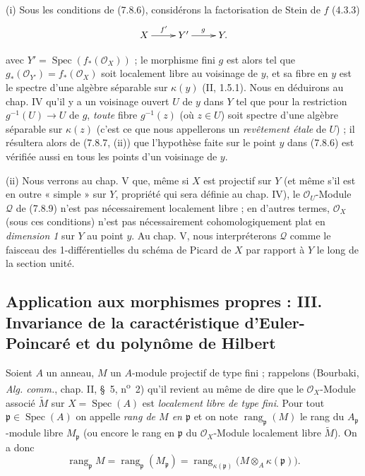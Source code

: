 \begin{remarks}[7.8.10]
\textnormal{(i)} Sous les conditions de (7.8.6), considérons la factorisation de
Stein de $f$ (4.3.3)
\[
\xymatrix{
  X \ar[r]^{f'} & Y' \ar[r]^{g} & Y .
}
\]

avec $Y'=\operatorname{Spec}(f_*(\mathscr O_X))$ ; le morphisme fini $g$ est alors
tel que $g_*(\mathscr O_{Y'})=f_*(\mathscr O_X)$ soit localement libre au
voisinage de $y$, et sa fibre en $y$ est le spectre d'une algèbre séparable sur
$\kappa(y)$ (II, 1.5.1). Nous en déduirons au chap. IV qu'il y a un voisinage
ouvert $U$ de $y$ dans $Y$ tel que pour la restriction $g^{-1}(U)\to U$ de $g$,
\emph{toute} fibre $g^{-1}(z)$ (où $z\in U$) soit spectre d'une algèbre séparable
sur $\kappa(z)$ (c'est ce que nous appellerons un \emph{revêtement étale} de
$U$) ; il résultera alors de (7.8.7, (ii)) que l'hypothèse faite sur le point
$y$ dans (7.8.6) est vérifiée aussi en tous les points d'un voisinage de $y$.

\medskip
\textnormal{(ii)} Nous verrons au chap. V que, même si $X$ est projectif sur $Y$
(et même s'il est en outre « simple » sur $Y$, propriété qui sera définie au
chap. IV), le $\mathscr O_U$-Module $\mathscr Q$ de (7.8.9) n'est pas
nécessairement localement libre ; en d'autres termes, $\mathscr O_X$ (sous ces
conditions) n'est pas nécessairement cohomologiquement plat en \emph{dimension
1} sur $Y$ au point $y$. Au chap. V, nous interpréterons $\mathscr Q$ comme le
faisceau des 1-différentielles du schéma de Picard de $X$ par rapport à $Y$ le
long de la section unité.
\end{remarks}

\subsection{Application aux morphismes propres : III. Invariance de la
caractéristique d'Euler-Poincaré et du polynôme de Hilbert}
\label{subsection:III.7.9.fr}
\label{III.7.9.fr}

\begin{env}[7.9.1]
\label{III.7.9.1.fr}
Soient $A$ un anneau, $M$ un $A$-module projectif de type fini ; rappelons
(Bourbaki, \emph{Alg. comm.}, chap. II, \S~5, n\textsuperscript{o}~2) qu'il
revient au même de dire que le $\mathscr O_X$-Module associé $\widetilde M$ sur
$X=\operatorname{Spec}(A)$ est \emph{localement libre de type fini}. Pour tout
$\mathfrak p\in\operatorname{Spec}(A)$ on appelle \emph{rang de $M$ en
$\mathfrak p$} et on note $\operatorname{rang}_{\mathfrak p}(M)$ le rang du
$A_{\mathfrak p}$-module libre $M_{\mathfrak p}$ (ou encore le rang en
$\mathfrak p$ du $\mathscr O_X$-Module localement libre $\widetilde M$). On a
donc
\[
  \operatorname{rang}_{\mathfrak p}M
  =\operatorname{rang}_{\mathfrak p}(M_{\mathfrak p})
  =\operatorname{rang}_{\kappa(\mathfrak p)}
  \bigl(M\otimes_A\kappa(\mathfrak p)\bigr).
  \tag{7.9.1.1}\label{III.7.9.1.1.fr}
\]
\end{env}

